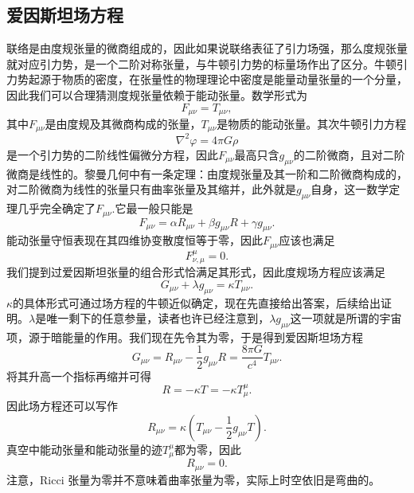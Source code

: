 \documentclass[11pt, a4paper, oneside, onecolumn]{ctexart}
\numberwithin{equation}{subsection}
\begin{document}
\subsection{爱因斯坦场方程}
联络是由度规张量的微商组成的，因此如果说联络表征了引力场强，那么度规张量就对应引力势，是一个二阶对称张量，与牛顿引力势的标量场作出了区分。牛顿引力势起源于物质的密度，在张量性的物理理论中密度是能量动量张量的一个分量，因此我们可以合理猜测度规张量依赖于能动张量。数学形式为
\begin{equation}
F_{\mu\nu}=T_{\mu\nu},
\end{equation}
其中$F_{\mu\nu}$是由度规及其微商构成的张量，$T_{\mu\nu}$是物质的能动张量。其次牛顿引力方程
\begin{equation}
\nabla^{2}\varphi=4\pi G\rho
\end{equation}
是一个引力势的二阶线性偏微分方程，因此$F_{\mu\nu}$最高只含$g_{\mu\nu}$的二阶微商，且对二阶微商是线性的。黎曼几何中有一条定理：由度规张量及其一阶和二阶微商构成的，对二阶微商为线性的张量只有曲率张量及其缩并，此外就是$g_{\mu\nu}$自身，这一数学定理几乎完全确定了$F_{\mu\nu}$.它最一般只能是
\begin{equation}
F_{\mu\nu}=\alpha R_{\mu\nu}+\beta g_{\mu\nu}R+\gamma g_{\mu\nu}.
\end{equation}
能动张量守恒表现在其四维协变散度恒等于零，因此$F_{\mu\nu}$应该也满足
\begin{equation}
F^{\mu}_{\nu,\mu}=0.
\end{equation}
我们提到过爱因斯坦张量的组合形式恰满足其形式，因此度规场方程应该满足
\begin{equation}
G_{\mu\nu}+\lambda g_{\mu\nu}=\kappa T_{\mu\nu}.
\end{equation}
$\kappa$的具体形式可通过场方程的牛顿近似确定，现在先直接给出答案，后续给出证明。$\lambda$是唯一剩下的任意参量，读者也许已经注意到，$\lambda g_{\mu\nu}$这一项就是所谓的宇宙项，源于暗能量的作用。我们现在先令其为零，于是得到爱因斯坦场方程
\begin{equation}
G_{\mu\nu}=R_{\mu\nu}-\frac12g_{\mu\nu}R=\frac{8\pi G}{c^{4}}T_{\mu\nu}.
\end{equation}
将其升高一个指标再缩并可得
\begin{equation}
R=-\kappa T=-\kappa T^{\mu}_{\mu}.
\end{equation}
因此场方程还可以写作
\begin{equation}
R_{\mu\nu}=\kappa\left(T_{\mu\nu}-\frac12g_{\mu\nu}T\right).
\end{equation}
真空中能动张量和能动张量的迹$T^{\mu}_{\mu}$都为零，因此
\begin{equation}
R_{\mu\nu}=0.
\end{equation}
注意，Ricci 张量为零并不意味着曲率张量为零，实际上时空依旧是弯曲的。
\end{document}
